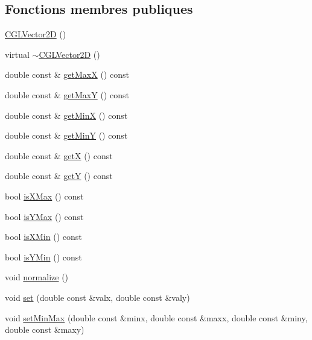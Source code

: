 \subsection*{Fonctions membres publiques}
\begin{DoxyCompactItemize}
\item 
\hyperlink{class_c_g_l_vector2_d_a777d33ddc05a95c0c4a56672d50a3138}{C\-G\-L\-Vector2\-D} ()
\item 
virtual \hyperlink{class_c_g_l_vector2_d_a93cf12a834078803bee4f19d42e09a02}{$\sim$\-C\-G\-L\-Vector2\-D} ()
\item 
double const \& \hyperlink{class_c_g_l_vector2_d_ae9a83a0a84269f3ddaae5339de94c17e}{get\-Max\-X} () const 
\item 
double const \& \hyperlink{class_c_g_l_vector2_d_a882866e67d9e60be3da4dd626c55967d}{get\-Max\-Y} () const 
\item 
double const \& \hyperlink{class_c_g_l_vector2_d_a2fee5114e405b765141db8a9e7d80424}{get\-Min\-X} () const 
\item 
double const \& \hyperlink{class_c_g_l_vector2_d_aecc92db660423309f4268293bc14ab85}{get\-Min\-Y} () const 
\item 
double const \& \hyperlink{class_c_g_l_vector2_d_a5f25e872259c579251336dfe0faf8701}{get\-X} () const 
\item 
double const \& \hyperlink{class_c_g_l_vector2_d_ad279638b74a0caac60632b169136688c}{get\-Y} () const 
\item 
bool \hyperlink{class_c_g_l_vector2_d_a61f90df90b91dcb413e9e1c72b8cbe1d}{is\-X\-Max} () const 
\item 
bool \hyperlink{class_c_g_l_vector2_d_a96ccb7ac910c4c8b1d390dba6306d79e}{is\-Y\-Max} () const 
\item 
bool \hyperlink{class_c_g_l_vector2_d_a9246e04841d8ef021f56d965d606bdd5}{is\-X\-Min} () const 
\item 
bool \hyperlink{class_c_g_l_vector2_d_a46b1951ce7743aaae330a44d40c38de9}{is\-Y\-Min} () const 
\item 
void \hyperlink{class_c_g_l_vector2_d_aca2031580314f92bf52c4e727247c8cd}{normalize} ()
\item 
void \hyperlink{class_c_g_l_vector2_d_a37b79a5ca7b3445df956e177f7c436fc}{set} (double const \&valx, double const \&valy)
\item 
void \hyperlink{class_c_g_l_vector2_d_ad3830da7d5449a24927930329d3304dd}{set\-Min\-Max} (double const \&minx, double const \&maxx, double const \&miny, double const \&maxy)
\item 

\end{DoxyCompactItemize}
